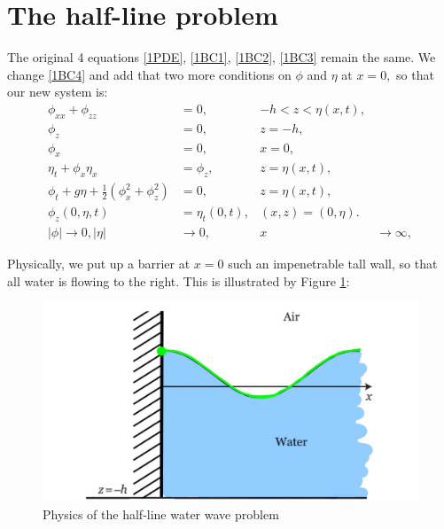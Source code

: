 \documentclass[10pt,reqno,oneside,a4paper]{article}
\begin{document}
\section{The half-line problem}
The original 4 equations \eqref{1PDE}, \eqref{1BC1}, \eqref{1BC2}, \eqref{1BC3} remain the same. We change \eqref{1BC4} and add that  two more conditions on $\phi$ and $\eta$ at $x=0,$ so that our new system is:
\begin{subequations} \label{DimHalfLineProblem}
\begin{align}
\phi_{xx} + \phi_{zz} &= 0, &-h < z < \eta(x,t), \\
\phi_{z} &= 0, &z = -h, \\
\label{BC1}\phi_{x} &= 0, &x =0, \\
\eta_t + \phi_{x}\eta_{x} &= \phi_{z}, & z = \eta(x,t), \\
\phi_t + g\eta + \frac{1}{2}(\phi_{x}^2 + \phi_{z}^2) &= 0, &z = \eta(x,t), \\
\label{BC2} \phi_{z}(0,\eta,t) &= \eta_t(0,t), &(x,z) = (0,\eta). \\
\label{BC3} |\phi| \to 0, |\eta| &\to 0,  &x &\to \infty,
\end{align}
\end{subequations}

Physically, we put up a barrier at $x=0$ such an impenetrable tall wall, so that all water is flowing to the right. This is illustrated by Figure \ref{fig:HWWP}:
\begin{figure}[h]
\begin{center}
        \includegraphics[scale=0.15]{Figures/HWWP.jpg}
        \caption{Physics of the half-line water wave problem}
        \label{fig:HWWP}
\end{center}
\end{figure}
\end{document}
